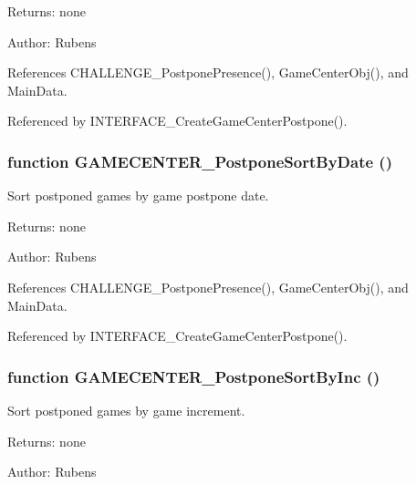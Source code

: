 \begin{Desc}
\item[Returns:]none \end{Desc}
\begin{Desc}
\item[Author:]Rubens \end{Desc}


References CHALLENGE\_\-PostponePresence(), GameCenterObj(), and MainData.

Referenced by INTERFACE\_\-CreateGameCenterPostpone().
\subsubsection[GAMECENTER\_\-PostponeSortByDate]{\setlength{\rightskip}{0pt plus 5cm}function GAMECENTER\_\-PostponeSortByDate ()}\label{gamecenter_2gamecenter_8js_7ab833d279ef7e348dcb5a951750c19d}


Sort postponed games by game postpone date. 

\begin{Desc}
\item[Returns:]none \end{Desc}
\begin{Desc}
\item[Author:]Rubens \end{Desc}


References CHALLENGE\_\-PostponePresence(), GameCenterObj(), and MainData.

Referenced by INTERFACE\_\-CreateGameCenterPostpone().
\subsubsection[GAMECENTER\_\-PostponeSortByInc]{\setlength{\rightskip}{0pt plus 5cm}function GAMECENTER\_\-PostponeSortByInc ()}\label{gamecenter_2gamecenter_8js_17055cc4dd50d79256c4b128b0fd80eb}


Sort postponed games by game increment. 

\begin{Desc}
\item[Returns:]none \end{Desc}
\begin{Desc}
\item[Author:]Rubens \end{Desc}


